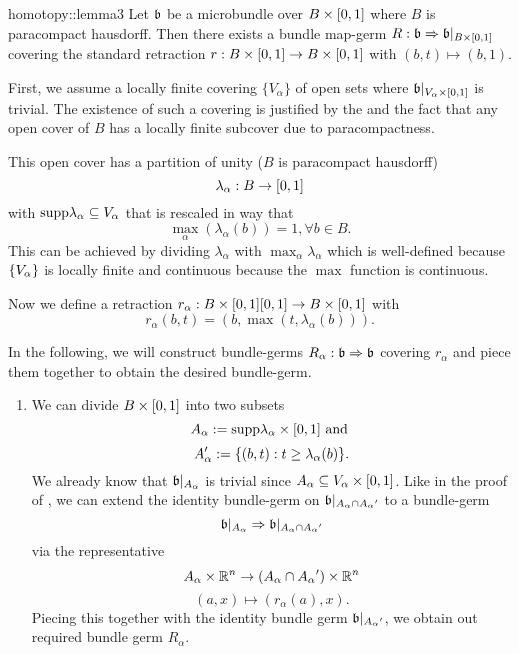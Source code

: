 \begin{scope}
    \newcommand{\A} {
        A_\alpha{}
    }

    \begin{mylemma}{homotopy::lemma3}
        Let $\mathfrak{b}$ be a microbundle over $B \times{} [0, 1]$ where $B$ is paracompact hausdorff.
        Then there exists a bundle map-germ $R: \mathfrak{b} \Rightarrow{} \mathfrak{b}\vert_{B \times{} [0, 1]}$
        covering the standard retraction $r: B \times{} [0, 1] \to B \times{} [0, 1]$ with $(b, t) \mapsto (b, 1)$.
    \end{mylemma}

    \begin{myproof}
        First, we assume a locally finite covering $\{V_\alpha\}$ of open sets where $\mathfrak{b}\vert_{V_\alpha \times{} [0, 1]}$ is trivial.
        The existence of such a covering is justified by the  and
        the fact that any open cover of $B$ has a locally finite subcover due to paracompactness.

        This open cover has a partition of unity ($B$ is paracompact hausdorff) 
        \[ \lambda_\alpha: B \to [0, 1] \]
        with $\text{supp} \lambda_\alpha \subseteq{} V_\alpha$ that is rescaled in way that
        \[ \max_\alpha(\lambda_\alpha(b)) = 1, \forall b \in B. \]
        This can be achieved by dividing $\lambda_\alpha$ with $\max_\alpha \lambda_\alpha$
        which is well-defined because $\{V_\alpha\}$ is locally finite and continuous because the $\max$ function is continuous.
        
        Now we define a retraction $r_\alpha: B \times{} [0, 1] [0, 1] \to B \times{} [0, 1]$ with
        \[ r_\alpha(b, t) = (b, \max(t, \lambda_\alpha(b))). \]

        In the following, we will construct bundle-germs $R_\alpha: \mathfrak{b} \Rightarrow{} \mathfrak{b}$ covering $r_\alpha$
        and piece them together to obtain the desired bundle-germ.
        \begin{enumerate}
            \item 
            We can divide $B \times [0, 1]$ into two subsets
            \[ A_\alpha := \text{supp}{\lambda_\alpha} \times{} [0, 1] \text{ and } \]
            \[ A'_\alpha := \{(b, t):t \ge \lambda_\alpha(b)\}. \]
            We already know that $\mathfrak{b}\vert_{A_\alpha}$ is trivial since $A_\alpha \subseteq{} V_\alpha \times{} [0, 1]$.
            Like in the proof of , we can extend the identity bundle-germ on $\bb\restr{\A \cap \A'}$ to a bundle-germ
            \[ \germ{\bb\restr{\A}}{\bb\restr{\A \cap \A'}} \]
            via the representative
            \[ \A \times \R^n \to (\A \cap \A') \times \R^n\]
            \[ (a, x) \mapsto (r_\alpha(a), x). \]
            Piecing this together with the identity bundle germ $\bb\restr{\A'}$, we obtain out required bundle germ $R_\alpha$.
            

\end{enumerate}
\end{myproof}
\end{scope}
